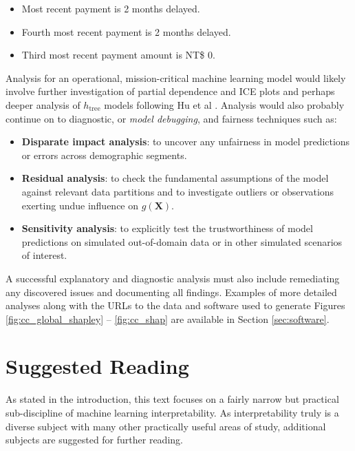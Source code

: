 \documentclass[11pt]{asaproc}
\begin{document}
\begin{itemize}

\item Most recent payment is 2 months delayed.
\item Fourth most recent payment is 2 months delayed.
\item Third most recent payment amount is NT\$ 0.

\end{itemize} 

Analysis for an operational, mission-critical machine learning model would likely involve further investigation of partial dependence and ICE plots and perhaps deeper analysis of $h_{\text{tree}}$ models following Hu et al \cite{lime-sup}. Analysis would also probably continue on to diagnostic, or \textit{model debugging}, and fairness techniques such as:

\begin{itemize}

\item \textbf{Disparate impact analysis}: to uncover any unfairness in model predictions or errors across demographic segments.
\item \textbf{Residual analysis}: to check the fundamental assumptions of the model against relevant data partitions and to investigate outliers or observations exerting undue influence on $g(\mathbf{X})$. 
\item \textbf{Sensitivity analysis}: to explicitly test the trustworthiness of model predictions on simulated out-of-domain data or in other simulated scenarios of interest.  

\end{itemize} 

\noindent A successful explanatory and diagnostic analysis must also include remediating any discovered issues and documenting all findings. Examples of more detailed analyses along with the URLs to the data and software used to generate Figures \ref{fig:cc_global_shapley} -- \ref{fig:cc_shap} are available in Section \ref{sec:software}.

\section{Suggested Reading} \label{sec:suggested}

As stated in the introduction, this text focuses on a fairly narrow but practical sub-discipline of machine learning interpretability. As interpretability truly is a diverse subject with many other practically useful areas of study, additional subjects are suggested for further reading.
\end{document}
